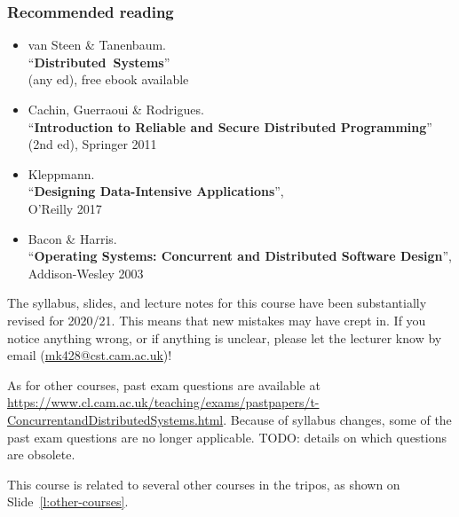 \begin{frame}
    \label{s:reading}
    \frametitle{Recommended reading}
    \begin{itemize}
        \item van Steen \& Tanenbaum.\\ ``\textbf{Distributed Systems}''\\(any ed), free ebook available
        \item Cachin, Guerraoui \& Rodrigues. \\ ``\textbf{Introduction to Reliable and Secure Distributed Programming}'' (2nd ed), Springer 2011
        \item Kleppmann.\\ ``\textbf{Designing Data-Intensive Applications}'',\\O’Reilly 2017
        \item Bacon \& Harris.\\ ``\textbf{Operating Systems: Concurrent and Distributed Software Design}'', Addison-Wesley 2003
    \end{itemize}
\end{frame}

The syllabus, slides, and lecture notes for this course have been substantially revised for 2020/21.
This means that new mistakes may have crept in.
If you notice anything wrong, or if anything is unclear, please let the lecturer know by email (\url{mk428@cst.cam.ac.uk})!

As for other courses, past exam questions are available at \url{https://www.cl.cam.ac.uk/teaching/exams/pastpapers/t-ConcurrentandDistributedSystems.html}.
Because of syllabus changes, some of the past exam questions are no longer applicable.
TODO: details on which questions are obsolete.

This course is related to several other courses in the tripos, as shown on Slide~\ref{l:other-courses}.

